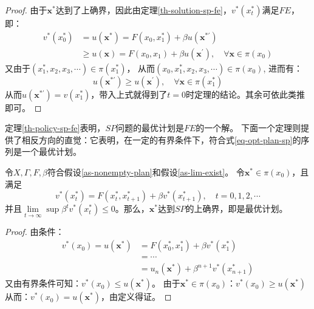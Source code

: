 \begin{proof}
    由于$\boldsymbol{x}^*$达到了上确界，因此由定理\ref{th-solution-sp-fe}，$v^*\left(x_t^*\right)$满足$FE$，即：
    \begin{equation*}
        \begin{aligned}
            v^*\left(x_0^*\right) &= u\left(\boldsymbol{x}^*\right) = F\left(x_0,x_1^*\right) 
                + \beta u\left(\boldsymbol{x^{*\prime}}\right) \\
            &\geq u\left(\boldsymbol{x}\right) = F\left(x_0,x_1\right)+\beta u\left(\boldsymbol{x}^{\prime}\right), \quad 
                \forall \boldsymbol{x}\in \pi\left(x_0\right)
        \end{aligned}
    \end{equation*}
    又由于$\left(x_1^*,x_2,x_3,\cdots\right)\in \pi\left(x_1^*\right)$，
    从而$\left(x_0,x_1^*,x_2,x_3,\cdots\right)\in \pi\left(x_0\right)$,
    进而有：
    $$u\left(\boldsymbol{x}^{*\prime}\right) \geq u\left(\boldsymbol{x}^{\prime}\right), \quad \forall \boldsymbol{x}\in \pi\left(x_1^*\right)$$
    从而$u\left(\boldsymbol{x}^{*\prime}\right)=v\left(x_1^*\right)$，带入上式就得到了$t=0$时定理的结论。其余可依此类推即可。
\end{proof}

定理\ref{th-policy-sp-fe}表明，$SP$问题的最优计划是$FE$的一个解。
下面一个定理则提供了相反方向的直觉：它表明，在一定的有界条件下，符合式\ref{eq-opt-plan-sp}的序列是一个最优计划。

\begin{theorem} \label{th-policy-fe-sp}
    令$X, \Gamma, F, \beta$符合假设\ref{as-nonempty-plan}和假设\ref{as-lim-exist}。
    令$\boldsymbol{x}^*\in \pi\left(x_0\right)$，且满足
    $$v^*\left(x_t^*\right) = F\left(x_t^*,x_{t+1}^*\right) + \beta v^*\left(x_{t+1}^*\right), \quad t=0,1,2,\cdots$$
    并且$\lim\limits_{t\rightarrow\infty}\sup\beta^t v^*\left(x_t^*\right)\leq 0$。那么，$\boldsymbol{x}^*$达到$SP$的上确界，即是最优计划。
\end{theorem}
\begin{proof}
    由条件：
    \begin{equation*}
        \begin{aligned}
            v^*\left(x_0\right) = u\left(\boldsymbol{x}^*\right)&= F\left(x_0^*,x_1^*\right)+\beta v^*\left(x_1^*\right) \\
                &= \cdots \\
                &= u_n\left(\boldsymbol{x}^*\right) + \beta^{n+1}v^*\left(x_{n+1}^*\right)
        \end{aligned}
    \end{equation*}
    又由有界条件可知：$v^*\left(x_0\right)\leq u\left(\boldsymbol{x}^*\right)$。
    由于$\boldsymbol{x}^*\in \pi\left(x_0\right)$：$v^*\left(x_0\right)\geq u\left(\boldsymbol{x}^*\right)$
    从而：$v^*\left(x_0\right) = u\left(\boldsymbol{x}^*\right)$，由定义得证。
\end{proof}

